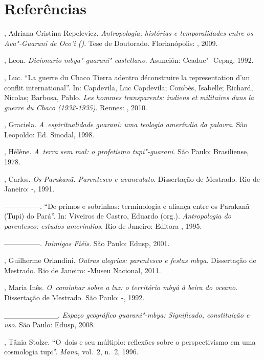 \section{Referências}

\begin{Parskip}
, Adriana Cristina Repelevicz. \emph{Antropologia, histórias e
temporalidades entre os Ava"-Guarani de Oco’i ()}. Tese de Doutorado.
Florianópolis: , 2009.

, Leon. \emph{Dicionario mbya"-guarani"-castellano}. Asunción: Ceaduc"-
Cepag, 1992.

, Luc. ``La guerre du Chaco Tierra adentro déconstruire la
representation d’un conflit international''. In: Capdevila, Luc
Capdevila; Combès, Isabelle; Richard, Nicolas; Barbosa, Pablo. \emph{Les
hommes transparents: indiens et militaires dans la guerre du Chaco
(1932-1935)}. Rennes: , 2010.

, Graciela. \emph{A~espiritualidade guarani: uma teologia ameríndia
da palavra}. São Leopoldo: Ed. Sinodal, 1998.

, Hélène. \emph{A~terra sem mal: o profetismo tupi"-guarani}. São Paulo:
Brasiliense, 1978.

, Carlos. \emph{Os Parakanã. Parentesco e avunculato}. Dissertação de
Mestrado. Rio de Janeiro: -, 1991.

—————. ``De primos e sobrinhas: terminologia e aliança entre os Parakanã
(Tupi) do Pará''. In: Viveiros de Castro, Eduardo (org.). \emph{Antropologia do
parentesco: estudos ameríndios}. Rio de Janeiro: Editora , 1995.

—————. \emph{Inimigos Fiéis}. São Paulo: Edusp, 2001.

, Guilherme Orlandini. \emph{Outras alegrias: parentesco e festas mbya}.
 Dissertação de Mestrado. Rio de Janeiro: -Museu Nacional, 2011.

, Maria Inês. \emph{O~caminhar sobre a luz: o território mbyá à beira
do oceano}. Dissertação de Mestrado. São Paulo: -, 1992.

\_\_\_\_\_\_\_\_\_\_. \emph{Espaço geográfico guarani"-mbya: Significado,
constituição e uso}. São Paulo: Edusp, 2008.

, Tânia Stolze. ``O~dois e seu múltiplo: reflexões sobre o
perspectivismo em uma cosmologia tupi''. \emph{Mana}, vol.~2, n.~2, 1996.


\end{Parskip}
